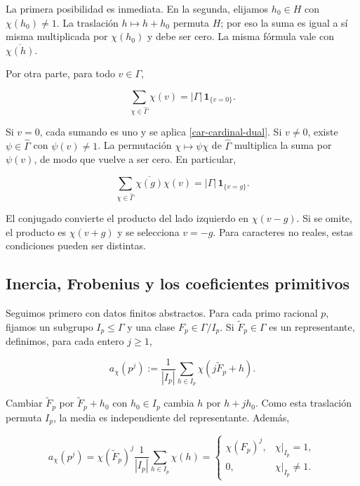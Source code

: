 La primera posibilidad es inmediata. En la segunda, elijamos $h_0\in H$ con $\chi(h_0)\ne1$. La traslación $h\mapsto h+h_0$ permuta $H$; por eso la suma es igual a sí misma multiplicada por $\chi(h_0)$ y debe ser cero. La misma fórmula vale con $\overline{\chi(h)}$.

Por otra parte, para todo $v\in\Gamma$,

\begin{equation}
\sum_{\chi\in\widehat\Gamma}\chi(v)
=|\Gamma|\,\mathbf 1_{\{v=0\}}.
\label{car-ortogonalidad-dual}
\end{equation}

Si $v=0$, cada sumando es uno y se aplica \eqref{car-cardinal-dual}. Si $v\ne0$, existe $\psi\in\widehat\Gamma$ con $\psi(v)\ne1$. La permutación $\chi\mapsto\psi\chi$ de $\widehat\Gamma$ multiplica la suma por $\psi(v)$, de modo que vuelve a ser cero. En particular,

\begin{equation}
\sum_{\chi\in\widehat\Gamma}
\overline{\chi(g)}\chi(v)
=|\Gamma|\,\mathbf1_{\{v=g\}}.
\label{car-ortogonalidad-pares}
\end{equation}

El conjugado convierte el producto del lado izquierdo en $\chi(v-g)$. Si se omite, el producto es $\chi(v+g)$ y se selecciona $v=-g$. Para caracteres no reales, estas condiciones pueden ser distintas.

\subsection{Inercia, Frobenius y los coeficientes primitivos}

Seguimos primero con datos finitos abstractos. Para cada primo racional $p$, fijamos un subgrupo $I_p\le\Gamma$ y una clase $F_p\in\Gamma/I_p$. Si $\widetilde F_p\in\Gamma$ es un representante, definimos, para cada entero $j\ge1$,

\begin{equation}
a_\chi(p^j)
:=\frac1{|I_p|}\sum_{h\in I_p}
\chi(j\widetilde F_p+h).
\label{car-media-inercia}
\end{equation}

Cambiar $\widetilde F_p$ por $\widetilde F_p+h_0$ con $h_0\in I_p$ cambia $h$ por $h+jh_0$. Como esta traslación permuta $I_p$, la media es independiente del representante. Además,

\begin{equation}
a_\chi(p^j)
=\chi(\widetilde F_p)^j
\frac1{|I_p|}\sum_{h\in I_p}\chi(h)
=
\begin{cases}
\chi(F_p)^j,&\chi|_{I_p}=1,\\
0,&\chi|_{I_p}\ne1.
\end{cases}
\label{car-coeficiente-local}
\end{equation}

